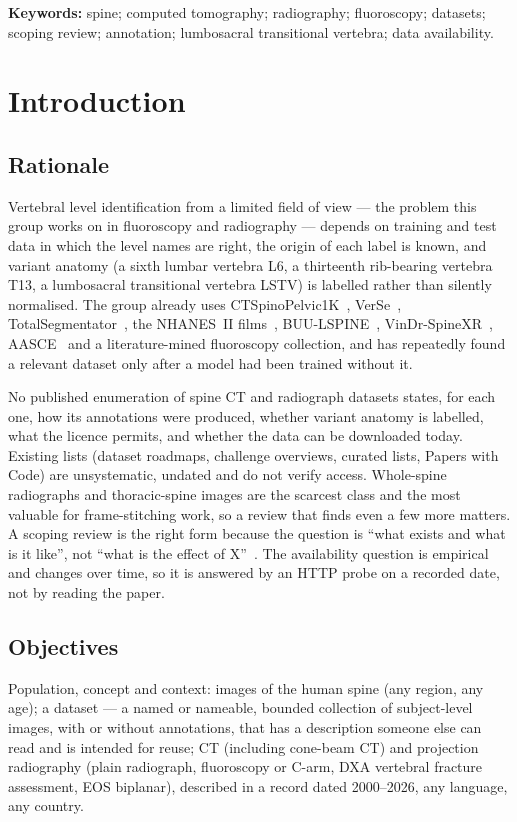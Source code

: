 \documentclass[11pt,a4paper]{article}
\newcommand{\yearRange}{2000--2026}
\begin{document}
\noindent\textbf{Keywords:} spine; computed tomography; radiography; fluoroscopy; datasets; scoping review; annotation; lumbosacral transitional vertebra; data availability.

\section{Introduction}

\subsection{Rationale}\label{sec:rationale}
Vertebral level identification from a limited field of view --- the problem this group works on in fluoroscopy and radiography --- depends on training and test data in which the level names are right, the origin of each label is known, and variant anatomy (a sixth lumbar vertebra L6, a thirteenth rib-bearing vertebra T13, a lumbosacral transitional vertebra LSTV) is labelled rather than silently normalised. The group already uses CTSpinoPelvic1K~\citep{schwing2026ctspinopelvic1k}, VerSe~\citep{sekuboyina2021verse}, TotalSegmentator~\citep{wasserthal2023totalsegmentator}, the NHANES~II films~\citep{long2005nhanes}, BUU-LSPINE~\citep{klinwichit2023buu}, VinDr-SpineXR~\citep{nguyen2021vindr}, AASCE~\citep{wu2017boostnet} and a literature-mined fluoroscopy collection, and has repeatedly found a relevant dataset only after a model had been trained without it.

No published enumeration of spine CT and radiograph datasets states, for each one, how its annotations were produced, whether variant anatomy is labelled, what the licence permits, and whether the data can be downloaded today. Existing lists (dataset roadmaps, challenge overviews, curated lists, Papers with Code) are unsystematic, undated and do not verify access. Whole-spine radiographs and thoracic-spine images are the scarcest class and the most valuable for frame-stitching work, so a review that finds even a few more matters. A scoping review is the right form because the question is ``what exists and what is it like'', not ``what is the effect of X''~\citep{peters2020scoping,peters2020jbi}. The availability question is empirical and changes over time, so it is answered by an HTTP probe on a recorded date, not by reading the paper.

\subsection{Objectives}\label{sec:objectives}
Population, concept and context: images of the human spine (any region, any age); a dataset --- a named or nameable, bounded collection of subject-level images, with or without annotations, that has a description someone else can read and is intended for reuse; CT (including cone-beam CT) and projection radiography (plain radiograph, fluoroscopy or C-arm, DXA vertebral fracture assessment, EOS biplanar), described in a record dated \yearRange, any language, any country.
\end{document}
